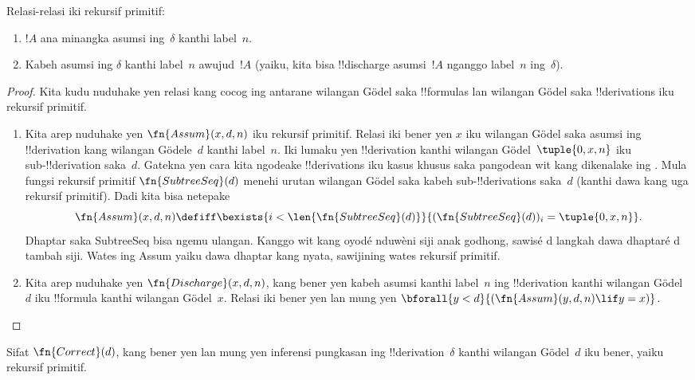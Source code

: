 \documentclass[../../../include/open-logic-section]{subfiles}
\begin{document}
\begin{prop}
  Relasi-relasi iki rekursif primitif:
  \begin{enumerate}
  \item $!A$ ana minangka asumsi ing~$\delta$ kanthi label~$n$.
  \item Kabeh asumsi ing $\delta$ kanthi label~$n$ awujud~$!A$
    (yaiku, kita bisa !!{discharge} asumsi~$!A$ nganggo label~$n$
    ing~$\delta$).
  \end{enumerate}
\end{prop}

\begin{proof}
  Kita kudu nuduhake yen relasi kang cocog ing antarane wilangan
  G\"odel saka !!{formula}s lan wilangan G\"odel saka
  !!{derivation}s iku rekursif primitif.
  \begin{enumerate}
  \item Kita arep nuduhake yen $\fn{Assum}(x, d, n)$ iku rekursif
    primitif. Relasi iki bener yen $x$ iku wilangan G\"odel saka
    asumsi ing !!{derivation} kang wilangan G\"odele~$d$
    kanthi label~$n$. Iki lumaku yen !!{derivation} kanthi wilangan
    G\"odel~$\tuple{0, x, n}$ iku sub-!!{derivation} saka~$d$.
    Gatekna yen cara kita ngodeake !!{derivation}s iku kasus khusus
    saka pangodean wit kang dikenalake ing
    . Mula fungsi rekursif primitif
    $\fn{SubtreeSeq}(d)$ menehi urutan wilangan G\"odel saka kabeh
    sub-!!{derivation}s saka~$d$ (kanthi dawa kang uga rekursif primitif).
    Dadi kita bisa netepake
    \[
    \fn{Assum}(x, d, n) \defiff \bexists{i<\len{\fn{SubtreeSeq}(d)}}{(\fn{SubtreeSeq}(d))_i =
      \tuple{0, x, n}}.
    \]
Dhaptar saka SubtreeSeq bisa ngemu ulangan. Kanggo wit kang oyodé nduwèni siji anak godhong, sawisé d langkah dawa dhaptaré d tambah siji. Wates ing Assum yaiku dawa dhaptar kang nyata, sawijining wates rekursif primitif.
  \item Kita arep nuduhake yen $\fn{Discharge}(x, d, n)$, kang
    bener yen kabeh asumsi kanthi label~$n$ ing !!{derivation}
    kanthi wilangan G\"odel~$d$ iku !!{formula} kanthi wilangan
    G\"odel~$x$. Relasi iki bener yen lan mung yen
    $\bforall{y<d}{(\fn{Assum}(y, d, n) \lif y
      = x)}$.
  \end{enumerate}
\end{proof}

\begin{prop}
  Sifat $\fn{Correct}(d)$, kang bener yen lan mung yen inferensi
  pungkasan ing !!{derivation}~$\delta$ kanthi wilangan G\"odel~$d$
  iku bener, yaiku rekursif primitif.
\end{prop}
\end{document}
